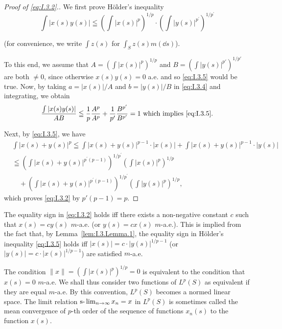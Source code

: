 \begin{proof}[Proof of \eqref{eq:I.3.2}.]
 We first prove Hölder's inequality 
\begin{equation}\label{eq:I.3.5}
\int | x (s) y (s) | \leqq \left(\int | x (s) | ^{p}\right) ^{1/p} \cdot \left(\int | y (s) | ^ {p^{\prime}}\right) ^ {1 / p^{\prime}}
\end{equation}

(for convenience, we write $\int z(s)$ for $\int_{S}z(s)m(\dd s)$). 


To this end, we assume that $A = \left( \int |x(s)|^p\right)^{1/p}$ and $B = \left( \int |y(s)|^{p'} \right)^{1/p'}$ are both $\neq 0$, since otherwise $x(s)y(s) = 0$ a.e. and so \eqref{eq:I.3.5} would be true. Now, by taking $a = |x(s)|/A$ and $b = |y(s)|/B$ in \eqref{eq:I.3.4} and integrating, we obtain 
\[
\frac {\int | x (s) y (s) |}{A B} \leqq \frac {1}{p} \frac {A ^{p}}{A ^{p}} + \frac {1}{p^{\prime}} \frac {B ^ {p^{\prime}}}{B ^ {p^{\prime}}} = 1 \text{ which implies } \eqref{eq:I.3.5}.
\]

Next, by \eqref{eq:I.3.5}, we have 
\[
\begin{aligned}
&\int | x (s) + y (s) | ^{p} \leqq \int | x (s) + y (s) | ^{p-1} \cdot | x (s) | + \int | x (s) + y (s) | ^{p-1} \cdot | y (s) |
\\
&\leqq \left(\int | x (s) + y (s) | ^ {p^{\prime} (p- 1)}\right) ^ {1 / p^{\prime}} \left(\int | x (s) | ^{p}\right) ^{1/p}
\\
&\quad + \left(\int | x (s) + y (s) | ^ {p^{\prime} (p- 1)}\right) ^ {1 / p^{\prime}} \left(\int | y (s) | ^{p}\right) ^{1/p},
\end{aligned}
\]
which proves \eqref{eq:I.3.2} by $p'(p - 1) = p$.
\end{proof}

\begin{remarkn}[Remark $1$] The equality sign in \eqref{eq:I.3.2} holds iff there exists a non-negative constant $c$ such that $x(s) = cy(s)$ $m$-a.e. (or $y(s) = cx(s)$ $m$-a.e.). This is implied from the fact that, by Lemma~\ref{lem:I.3.Lemma.1}, the equality sign in Hölder's inequality \eqref{eq:I.3.5} holds iff $|x(s)| = c \cdot |y(s)|^{1/p-1}$ (or $|y(s)| = c \cdot |x(s)|^{1/p-1}$) are satisfied $m$-a.e. 
\end{remarkn}

\begin{remarkn}[Remark $2$] The condition $\|x\| = \left(\int |x(s)|^p\right)^{1/p} = 0$ is equivalent to the condition that $x(s) = 0$ $m$-a.e. We shall thus consider two functions of $L^p(S)$ as equivalent if they are equal $m$-a.e. By this convention, $L^p(S)$ becomes a normed linear space. The limit relation $\text{s-}\lim\nolimits_{n \to \infty} x_n = x$ in $L^p(S)$ is sometimes called the mean convergence of $p$-th order of the sequence of functions $x_n(s)$ to the function $x(s)$. 
\end{remarkn}

